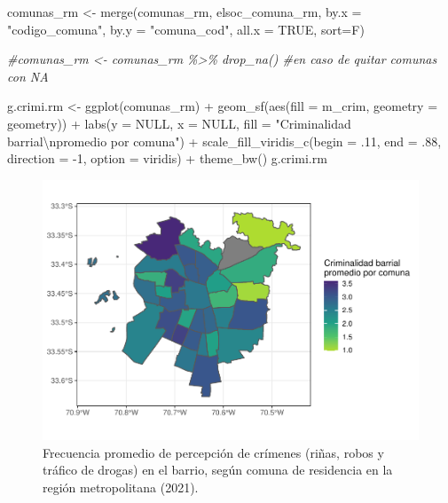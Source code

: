\documentclass[
  12pt,
]{book}
\newenvironment{Shaded}{\begin{snugshade}}{\end{snugshade}}
\newcommand{\AttributeTok}[1]{\textcolor[rgb]{0.77,0.63,0.00}{#1}}
\newcommand{\CommentTok}[1]{\textcolor[rgb]{0.56,0.35,0.01}{\textit{#1}}}
\newcommand{\ConstantTok}[1]{\textcolor[rgb]{0.00,0.00,0.00}{#1}}
\newcommand{\DecValTok}[1]{\textcolor[rgb]{0.00,0.00,0.81}{#1}}
\newcommand{\FunctionTok}[1]{\textcolor[rgb]{0.00,0.00,0.00}{#1}}
\newcommand{\NormalTok}[1]{#1}
\newcommand{\OtherTok}[1]{\textcolor[rgb]{0.56,0.35,0.01}{#1}}
\newcommand{\SpecialCharTok}[1]{\textcolor[rgb]{0.00,0.00,0.00}{#1}}
\newcommand{\StringTok}[1]{\textcolor[rgb]{0.31,0.60,0.02}{#1}}
\begin{document}
\begin{Shaded}
\begin{Highlighting}[]
\NormalTok{comunas\_rm }\OtherTok{\textless{}{-}} \FunctionTok{merge}\NormalTok{(comunas\_rm, }
\NormalTok{                    elsoc\_comuna\_rm, }
                    \AttributeTok{by.x =} \StringTok{"codigo\_comuna"}\NormalTok{, }\AttributeTok{by.y =} \StringTok{"comuna\_cod"}\NormalTok{,}
                    \AttributeTok{all.x =} \ConstantTok{TRUE}\NormalTok{,}
                    \AttributeTok{sort=}\NormalTok{F)}

\CommentTok{\#comunas\_rm \textless{}{-} comunas\_rm \%\textgreater{}\% drop\_na() \#en caso de quitar comunas con NA}

\NormalTok{g.crimi.rm }\OtherTok{\textless{}{-}} 
  \FunctionTok{ggplot}\NormalTok{(comunas\_rm) }\SpecialCharTok{+} 
  \FunctionTok{geom\_sf}\NormalTok{(}\FunctionTok{aes}\NormalTok{(}\AttributeTok{fill =}\NormalTok{ m\_crim, }\AttributeTok{geometry =}\NormalTok{ geometry)) }\SpecialCharTok{+}
  \FunctionTok{labs}\NormalTok{(}\AttributeTok{y =} \ConstantTok{NULL}\NormalTok{, }\AttributeTok{x =} \ConstantTok{NULL}\NormalTok{, }\AttributeTok{fill =} \StringTok{"Criminalidad barrial}\SpecialCharTok{\textbackslash{}n}\StringTok{promedio por comuna"}\NormalTok{) }\SpecialCharTok{+}
  \FunctionTok{scale\_fill\_viridis\_c}\NormalTok{(}\AttributeTok{begin =}\NormalTok{ .}\DecValTok{11}\NormalTok{, }\AttributeTok{end =}\NormalTok{ .}\DecValTok{88}\NormalTok{, }\AttributeTok{direction =} \SpecialCharTok{{-}}\DecValTok{1}\NormalTok{, }\AttributeTok{option =} \StringTok{\textquotesingle{}viridis\textquotesingle{}}\NormalTok{) }\SpecialCharTok{+}
  \FunctionTok{theme\_bw}\NormalTok{() }
\NormalTok{g.crimi.rm}
\end{Highlighting}
\end{Shaded}

\begin{figure}

{\centering \includegraphics{reporte-elsoc_files/figure-latex/crimi-comuna-1} 

}

\caption{Frecuencia promedio de percepción de crímenes (riñas, robos y tráfico de drogas) en el barrio, según comuna de residencia en la región metropolitana (2021).}\label{fig:crimi-comuna}
\end{figure}
\end{document}
